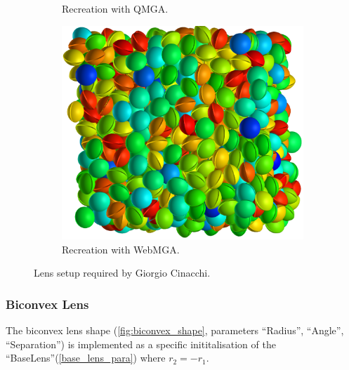 \begin{figure}
\begin{center}
\begin{subfigure}{0.3\textwidth}
      \caption{Recreation with QMGA.}
      \label{fig:cinacchi_lens_qmga}
    \end{subfigure}
    \begin{subfigure}{0.3\textwidth}
      \includegraphics[width=\textwidth]{assets/images/webmga}
      \caption{Recreation with WebMGA.}
      \label{fig:cinacchi_lens_webmga}
    \end{subfigure}
  \end{center}
  \caption{Lens setup required by Giorgio Cinacchi.}
  \label{fig:cinacchi_lens}
\end{figure}

\subsubsection{Biconvex Lens}
\label{biconvex_section}
The biconvex lens shape (\cref{fig:biconvex_shape}, parameters ``Radius'', ``Angle'', ``Separation'') is implemented as a specific inititalisation of the ``BaseLens''(\cref{base_lens_para}) where $r_2=-r_1$.

